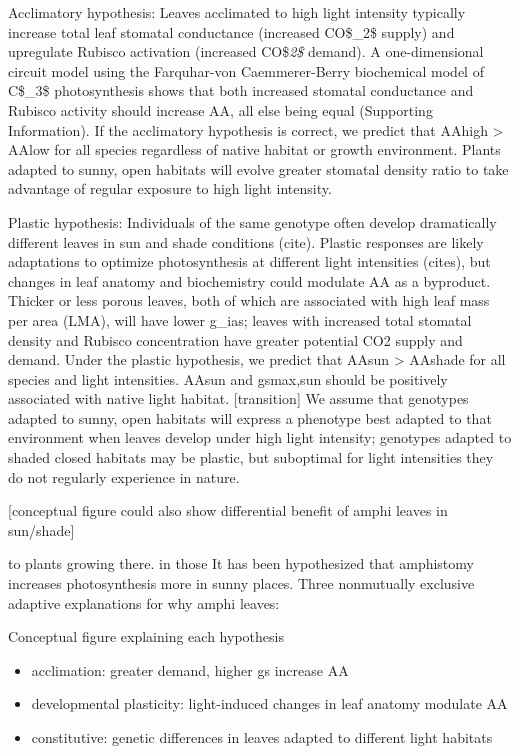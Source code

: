 \documentclass[
  letterpaper,
  DIV=11,
  numbers=noendperiod]{scrartcl}
\providecommand{\tightlist}{%
  \setlength{\itemsep}{0pt}\setlength{\parskip}{0pt}}\usepackage{longtable,booktabs,array}
\begin{document}
Acclimatory hypothesis: Leaves acclimated to high light intensity
typically increase total leaf stomatal conductance (increased CO\$\_2\$
supply) and upregulate Rubisco activation (increased CO\$\emph{2\$}
demand). A one-dimensional circuit model using the Farquhar-von
Caemmerer-Berry biochemical model of C\$\_3\$ photosynthesis shows that
both increased stomatal conductance and Rubisco activity should increase
AA, all else being equal (Supporting Information). If the acclimatory
hypothesis is correct, we predict that AAhigh \textgreater{} AAlow for
all species regardless of native habitat or growth environment. Plants
adapted to sunny, open habitats will evolve greater stomatal density
ratio to take advantage of regular exposure to high light intensity.

Plastic hypothesis: Individuals of the same genotype often develop
dramatically different leaves in sun and shade conditions (cite).
Plastic responses are likely adaptations to optimize photosynthesis at
different light intensities (cites), but changes in leaf anatomy and
biochemistry could modulate AA as a byproduct. Thicker or less porous
leaves, both of which are associated with high leaf mass per area (LMA),
will have lower g\_ias; leaves with increased total stomatal density and
Rubisco concentration have greater potential CO2 supply and demand.
Under the plastic hypothesis, we predict that AAsun \textgreater{}
AAshade for all species and light intensities. AAsun and gsmax,sun
should be positively associated with native light habitat.
{[}transition{]} We assume that genotypes adapted to sunny, open
habitats will express a phenotype best adapted to that environment when
leaves develop under high light intensity; genotypes adapted to shaded
closed habitats may be plastic, but suboptimal for light intensities
they do not regularly experience in nature.

{[}conceptual figure could also show differential benefit of amphi
leaves in sun/shade{]}

to plants growing there. in those It has been hypothesized that
amphistomy increases photosynthesis more in sunny places. Three
nonmutually exclusive adaptive explanations for why amphi leaves:

Conceptual figure explaining each hypothesis

\begin{itemize}
\tightlist
\item
  acclimation: greater demand, higher gs increase AA
\item
  developmental plasticity: light-induced changes in leaf anatomy
  modulate AA
\item
  constitutive: genetic differences in leaves adapted to different light
  habitats
\end{itemize}
\end{document}
